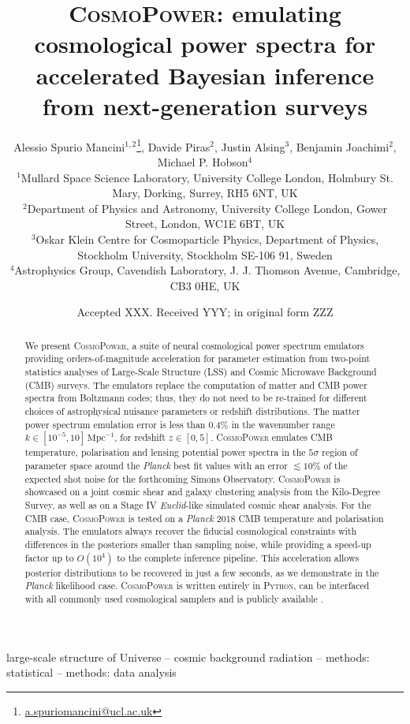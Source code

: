 \documentclass[fleqn,usenatbib]{mnras}
\title[\textsc{CosmoPower}]{\textsc{CosmoPower}: emulating cosmological power spectra for accelerated Bayesian inference from next-generation surveys}
\author[A. Spurio Mancini et al.]{
Alessio Spurio Mancini$^{1, 2}$\thanks{\href{mailto:a.spuriomancini@ucl.ac.uk}{a.spuriomancini@ucl.ac.uk}},
Davide Piras$^{2}$,
Justin Alsing$^{3}$,
Benjamin Joachimi$^{2}$,
Michael P. Hobson$^{4}$
\\
$^{1}$Mullard Space Science Laboratory, University College London,
Holmbury St. Mary, Dorking, Surrey, RH5 6NT, UK \\
$^{2}$Department of Physics and Astronomy, University College London, Gower Street, London, WC1E 6BT, UK \\
$^{3}$Oskar Klein Centre for Cosmoparticle Physics, Department of Physics, Stockholm University, Stockholm SE-106 91, Sweden \\
$^{4}$Astrophysics Group, Cavendish Laboratory, J. J. Thomson Avenue, Cambridge, CB3 0HE, UK
}
\date{Accepted XXX. Received YYY; in original form ZZZ}
\begin{document}
\label{firstpage}
\pagerange{\pageref{firstpage}--\pageref{lastpage}}
\maketitle

\begin{abstract}
We present \textsc{CosmoPower}, a suite of neural cosmological power spectrum emulators providing orders-of-magnitude acceleration for parameter estimation from two-point statistics analyses of Large-Scale Structure (LSS) and Cosmic Microwave Background (CMB) surveys. The emulators replace the computation of matter and CMB power spectra from Boltzmann codes; thus, they do not need to be re-trained for different choices of astrophysical nuisance parameters or redshift distributions. The matter power spectrum emulation error is less than $0.4\%$ in the wavenumber range $k \in [10^{-5}, 10] \, \mathrm{Mpc}^{-1}$, for redshift $z \in [0, 5]$. \textsc{CosmoPower} emulates CMB temperature, polarisation and lensing potential power spectra in the $5\sigma$ region of parameter space around the \textit{Planck} best fit values with an error $\lesssim 10\%$ of the expected shot noise for the forthcoming Simons Observatory. \textsc{CosmoPower} is showcased on a joint cosmic shear and galaxy clustering analysis from the Kilo-Degree Survey, as well as on a Stage IV \textit{Euclid}-like simulated cosmic shear analysis. For the CMB case, \textsc{CosmoPower} is tested on a \textit{Planck} 2018 CMB temperature and polarisation analysis. The emulators always recover the fiducial cosmological constraints with differences in the posteriors smaller than sampling noise, while providing a speed-up factor up to $O(10^4)$ to the complete inference pipeline. This acceleration allows posterior distributions to be recovered in just a few seconds, as we demonstrate in the \textit{Planck} likelihood case. \textsc{CosmoPower} is written entirely in \textsc{Python}, can be interfaced with all commonly used cosmological samplers and is publicly available \href{https://github.com/alessiospuriomancini/cosmopower}{}.
\end{abstract}

\begin{keywords}
large-scale structure of Universe -- cosmic background radiation -- methods: statistical -- methods: data analysis
\end{keywords}
\end{document}
